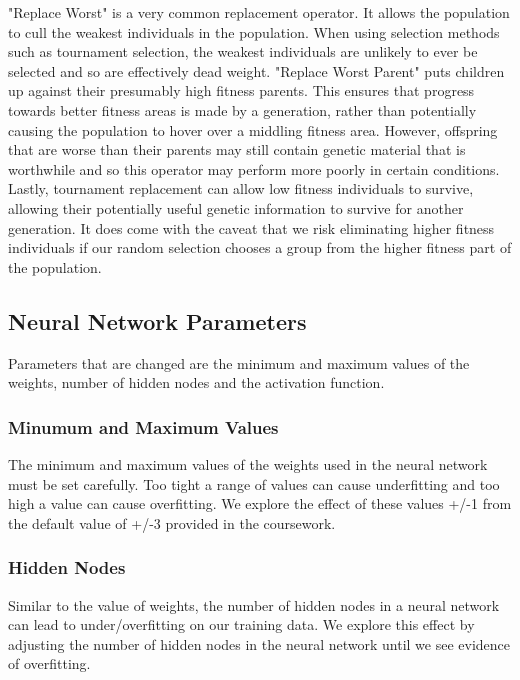 \documentclass[sigconf]{acmart}
\begin{document}
"Replace Worst" is a very common replacement operator. It allows the population to cull the weakest individuals in the population. When using selection methods such as tournament selection, the weakest individuals are unlikely to ever be selected and so are effectively dead weight. "Replace Worst Parent" puts children up against their presumably high fitness parents. This ensures that progress towards better fitness areas is made by a generation, rather than potentially causing the population to hover over a middling fitness area. However, offspring that are worse than their parents may still contain genetic material that is worthwhile and so this operator may perform more poorly in certain conditions. Lastly, tournament replacement can allow low fitness individuals to survive, allowing their potentially useful genetic information to survive for another generation. It does come with the caveat that we risk eliminating higher fitness individuals if our random selection chooses a group from the higher fitness part of the population.
\subsection{Neural Network Parameters}
Parameters that are changed are the minimum and maximum values of the weights, number of hidden nodes and the activation function.
\subsubsection{Minumum and Maximum Values}
The minimum and maximum values of the weights used in the neural network must be set carefully. Too tight a range of values can cause underfitting and too high a value can cause overfitting. We explore the effect of these values +/-1 from the default value of +/-3 provided in the coursework.

\subsubsection{Hidden Nodes}
Similar to the value of weights, the number of hidden nodes in a neural network can lead to under/overfitting on our training data. We explore this effect by adjusting the number of hidden nodes in the neural network until we see evidence of overfitting.
\end{document}
